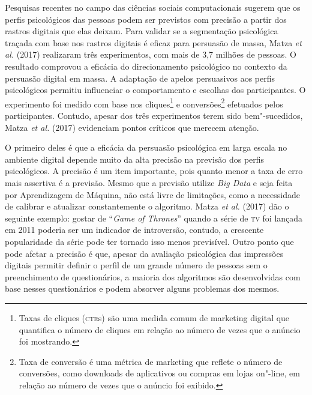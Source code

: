 Pesquisas recentes no campo das ciências sociais computacionais sugerem
que os perfis psicológicos das pessoas podem ser previstos com precisão
a partir dos rastros digitais que elas deixam. Para validar se a
segmentação psicológica traçada com base nos rastros digitais é eficaz
para persuasão de massa, Matza \emph{et al.} (2017) realizaram três
experimentos, com mais de 3,7 milhões de pessoas. O resultado comprovou
a eficácia do direcionamento psicológico no contexto da persuasão
digital em massa. A adaptação de apelos persuasivos aos perfis
psicológicos permitiu influenciar o comportamento e escolhas dos
participantes. O experimento foi medido com base nos cliques\footnote{Taxas
  de cliques (\textsc{ctr}s) são uma medida comum de marketing digital que
  quantifica o número de cliques em relação ao número de vezes que o
  anúncio foi mostrando.} e conversões\footnote{Taxa de conversão é uma
  métrica de marketing que reflete o número de conversões, como
  downloads de aplicativos ou compras em lojas on"-line, em relação ao
  número de vezes que o anúncio foi exibido.} efetuados pelos
participantes. Contudo, apesar dos três experimentos terem sido
bem"-sucedidos, Matza \emph{et al.} (2017) evidenciam pontos críticos que merecem
atenção.

O primeiro deles é que a eficácia da persuasão psicológica em larga
escala no ambiente digital depende muito da alta precisão na previsão
dos perfis psicológicos. A precisão é um item importante, pois quanto
menor a taxa de erro mais assertiva é a previsão. Mesmo que a previsão
utilize \emph{Big Data} e seja feita por Aprendizagem de Máquina, não
está livre de limitações, como a necessidade de calibrar e atualizar
constantemente o algoritmo. Matza \emph{et al.} (2017) dão o seguinte exemplo:
gostar de ``\emph{Game of Thrones}'' quando a série de \textsc{tv} foi lançada em
2011 poderia ser um indicador de introversão, contudo, a crescente
popularidade da série pode ter tornado isso menos previsível. Outro
ponto que pode afetar a precisão é que, apesar da avaliação psicológica
das impressões digitais permitir definir o perfil de um grande número de
pessoas sem o preenchimento de questionários, a maioria dos algoritmos
são desenvolvidas com base nesses questionários e podem absorver alguns
problemas dos mesmos.


